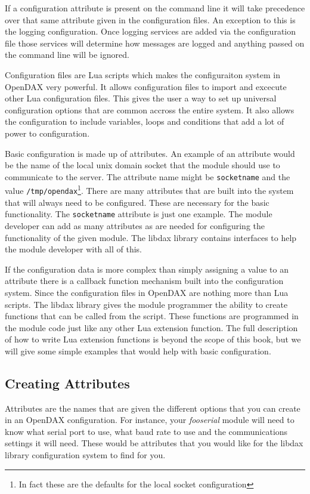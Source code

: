If a configuration
attribute is present on the command line it will take precedence over that same
attribute given in the configuration files.  An exception to this is the logging
configuration.  Once logging services are added via the configuration file those
services will determine how messages are logged and anything passed on the 
command line will be ignored.

Configuration files are Lua scripts which makes the configuraiton system in
OpenDAX very powerful.  It allows configuration files to import and excecute 
other Lua configuration files.  This gives the user a way to set up universal 
configuration options that are common accross the entire system.  It also allows
the configuration to include variables, loops and conditions that add a lot
of power to configuration.

Basic configuration is made up of attributes.  An example of an attribute would be the
name of the local unix domain socket that the module should use to communicate
to the server.  The attribute name might be \texttt{socketname} and the value
\texttt{/tmp/opendax}\footnote{In fact these are the defaults for the local
	socket configuration}.  There are many attributes that are built into the system
that will always need to be configured.  These are necessary for the basic
functionality.  The \texttt{socketname} attribute is just one example.  The
module developer can add as many attributes as are needed for configuring the
functionality of the given module.  The libdax library contains interfaces to
help the module developer with all of this.

If the configuration data is more complex than simply assigning a value to an
attribute there is a callback function mechanism built into the configuration
system.  Since the configuration files in OpenDAX are nothing more than Lua scripts.
The libdax library gives the module programmer the ability to create functions
that can be called from the script.  These functions are programmed in the
module code just like any other Lua extension function.  The full description of
how to write Lua extension functions is beyond the scope of this book, but we
will give some simple examples that would help with basic configuration.


\subsection{Creating Attributes}
Attributes are the names that
are given the different options that you can create in an OpenDAX configuration.
For instance, your \textit{fooserial} module will need to know what serial port
to use, what baud rate to use and the communications settings it will need.
These would be attributes that you would like for the libdax library
configuration system to find for you.

